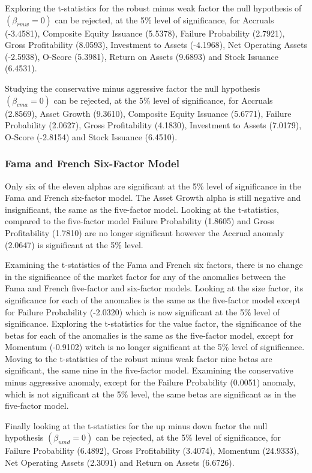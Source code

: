 \documentclass[12pt, a4paper, oneside]{article}
\begin{document}
Exploring the t-statistics for the robust minus weak factor the null hypothesis of $(\beta_{rmw}= 0)$ can be rejected, at the 5\% level of significance, for Accruals (-3.4581), Composite Equity Issuance (5.5378), Failure Probability (2.7921), Gross Profitability (8.0593), Investment to Assets (-4.1968), Net Operating Assets (-2.5938), O-Score (5.3981), Return on Assets (9.6893) and Stock Issuance (6.4531).

Studying the conservative minus aggressive factor the null hypothesis $(\beta_{cma}= 0)$ can be rejected, at the 5\% level of significance, for Accruals (2.8569), Asset Growth (9.3610), Composite Equity Issuance (5.6771), Failure Probability (2.0627), Gross Profitability (4.1830), Investment to Assets (7.0179), O-Score (-2.8154) and Stock Issuance (6.4510).

\subsubsection{Fama and French Six-Factor Model}
Only six of the eleven alphas are significant at the 5\% level of significance in the Fama and French six-factor model. The Asset Growth alpha is still negative and insignificant, the same as the five-factor model. Looking at the t-statistics, compared to the five-factor model Failure Probability (1.8605) and Gross Profitability (1.7810) are no longer significant however the Accrual anomaly (2.0647) is significant at the 5\% level.

Examining the t-statistics of the Fama and French six factors, there is no change in the significance of the market factor for any of the anomalies between the Fama and French five-factor and six-factor models. Looking at the size factor, its significance for each of the anomalies is the same as the five-factor model except for Failure Probability (-2.0320) which is now significant at the 5\% level of significance. Exploring the t-statistics for the value factor, the significance of the betas for each of the anomalies is the same as the five-factor model, except for Momentum (-0.9102) witch is no longer significant at the 5\% level of significance. Moving to the t-statistics of the robust minus weak factor nine betas are significant, the same nine in the five-factor model. Examining the conservative minus aggressive anomaly, except for the Failure Probability (0.0051) anomaly, which is not significant at the 5\% level, the same betas are significant as in the five-factor model.

Finally looking at the t-statistics for the up minus down factor the null hypothesis $(\beta_{umd}= 0)$ can be rejected, at the 5\% level of significance, for Failure Probability (6.4892), Gross Profitability (3.4074), Momentum (24.9333), Net Operating Assets (2.3091) and Return on Assets (6.6726).
\end{document}
